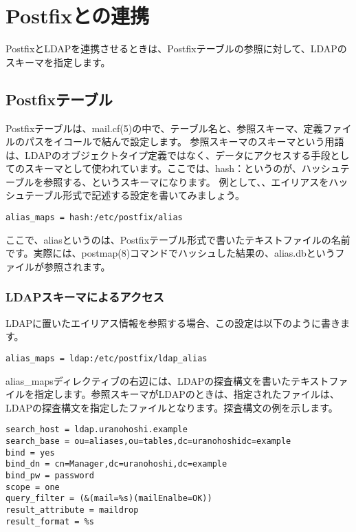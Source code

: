 \chapter{Postfixとの連携}

PostfixとLDAPを連携させるときは、Postfixテーブルの参照に対して、LDAPのスキーマを指定します。

\section{Postfixテーブル}


Postfixテーブルは、mail.cf(5)の中で、テーブル名と、参照スキーマ、定義ファイルのパスをイコールで結んで設定します。
参照スキーマのスキーマという用語は、LDAPのオブジェクトタイプ定義ではなく、データにアクセスする手段としてのスキーマとして使われています。ここでは、hash：というのが、ハッシュテーブルを参照する、というスキーマになります。
例として、、エイリアスをハッシュテーブル形式で記述する設定を書いてみましょう。

\begin{verbatim}
alias_maps = hash:/etc/postfix/alias
\end{verbatim}

ここで、aliasというのは、Postfixテーブル形式で書いたテキストファイルの名前です。実際には、postmap(8)コマンドでハッシュした結果の、alias.dbというファイルが参照されます。

\subsection{LDAPスキーマによるアクセス}

LDAPに置いたエイリアス情報を参照する場合、この設定は以下のように書きます。

\begin{verbatim}
alias_maps = ldap:/etc/postfix/ldap_alias
\end{verbatim}

alias\_mapsディレクティブの右辺には、LDAPの探査構文を書いたテキストファイルを指定します。参照スキーマがLDAPのときは、指定されたファイルは、LDAPの探査構文を指定したファイルとなります。探査構文の例を示します。

\begin{verbatim}
search_host = ldap.uranohoshi.example
search_base = ou=aliases,ou=tables,dc=uranohoshidc=example
bind = yes
bind_dn = cn=Manager,dc=uranohoshi,dc=example
bind_pw = password
scope = one
query_filter = (&(mail=%s)(mailEnalbe=OK))
result_attribute = maildrop
result_format = %s
\end{verbatim}

